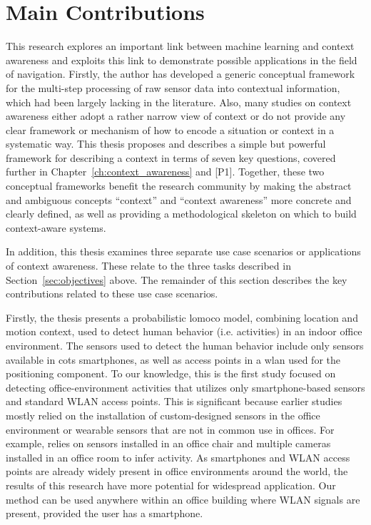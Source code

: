 \section{Main Contributions}
\label{sec:contributions}

This research explores an important link between machine learning and context awareness and exploits this link to demonstrate possible applications in the field of navigation. Firstly, the author has developed a generic conceptual framework for the multi-step processing of raw sensor data into contextual information, which had been largely lacking in the literature.  Also, many studies on context awareness either adopt a rather narrow view of context or do not provide any clear framework or mechanism of how to encode a situation or context in a systematic way. This thesis proposes and describes a simple but powerful framework for describing a context in terms of seven key questions, covered further in Chapter~\ref{ch:context_awareness} and [P1]. Together, these two conceptual frameworks benefit the research community by making the abstract and ambiguous concepts ``context'' and ``context awareness'' more concrete and clearly defined, as well as providing a methodological skeleton on which to build context-aware systems.

In addition, this thesis examines three separate use case scenarios or applications of context awareness. These relate to the three tasks described in Section~\ref{sec:objectives} above. The remainder of this section describes the key contributions related to these use case scenarios.

Firstly, the thesis presents a probabilistic \gls{lomoco} model, combining location and motion context, used to detect human behavior (i.e. activities) in an indoor office environment. The sensors used to detect the human behavior include only sensors available in \gls{cots} smartphones, as well as access points in a \gls{wlan} used for the positioning component. To our knowledge, this is the first study focused on detecting office-environment activities that utilizes only smartphone-based sensors and standard WLAN access points. This is significant because earlier studies mostly relied on the installation of custom-designed sensors in the office environment or wearable sensors that are not in common use in offices. For example, \cite{Manabe2010} relies on sensors installed in an office chair and multiple cameras installed in an office room to infer activity. As smartphones and WLAN access points are already widely present in office environments around the world, the results of this research have more potential for widespread application. Our method can be used anywhere within an office building where WLAN signals are present, provided the user has a smartphone.


